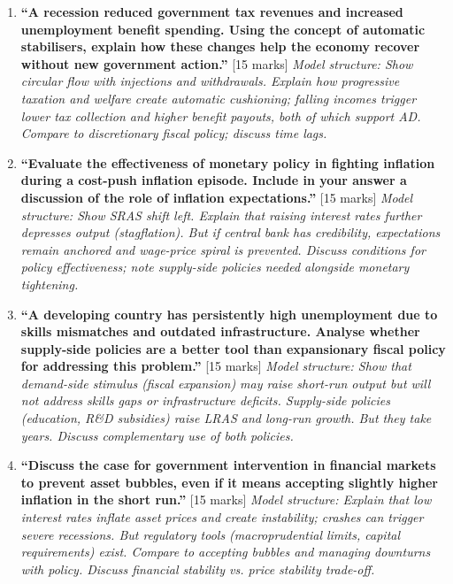 \documentclass[11pt, a4paper, twoside]{book}
\begin{document}
\begin{exampractice}
\begin{enumerate}[leftmargin=*]
\item \textbf{``A recession reduced government tax revenues and increased unemployment benefit spending. Using the concept of automatic stabilisers, explain how these changes help the economy recover without new government action.''} [15 marks]
\textit{Model structure: Show circular flow with injections and withdrawals. Explain how progressive taxation and welfare create automatic cushioning; falling incomes trigger lower tax collection and higher benefit payouts, both of which support AD. Compare to discretionary fiscal policy; discuss time lags.}

\item \textbf{``Evaluate the effectiveness of monetary policy in fighting inflation during a cost-push inflation episode. Include in your answer a discussion of the role of inflation expectations.''} [15 marks]
\textit{Model structure: Show SRAS shift left. Explain that raising interest rates further depresses output (stagflation). But if central bank has credibility, expectations remain anchored and wage-price spiral is prevented. Discuss conditions for policy effectiveness; note supply-side policies needed alongside monetary tightening.}

\item \textbf{``A developing country has persistently high unemployment due to skills mismatches and outdated infrastructure. Analyse whether supply-side policies are a better tool than expansionary fiscal policy for addressing this problem.''} [15 marks]
\textit{Model structure: Show that demand-side stimulus (fiscal expansion) may raise short-run output but will not address skills gaps or infrastructure deficits. Supply-side policies (education, R\&D subsidies) raise LRAS and long-run growth. But they take years. Discuss complementary use of both policies.}

\item \textbf{``Discuss the case for government intervention in financial markets to prevent asset bubbles, even if it means accepting slightly higher inflation in the short run.''} [15 marks]
\textit{Model structure: Explain that low interest rates inflate asset prices and create instability; crashes can trigger severe recessions. But regulatory tools (macroprudential limits, capital requirements) exist. Compare to accepting bubbles and managing downturns with policy. Discuss financial stability vs. price stability trade-off.}


\end{enumerate}
\end{exampractice}
\end{document}
